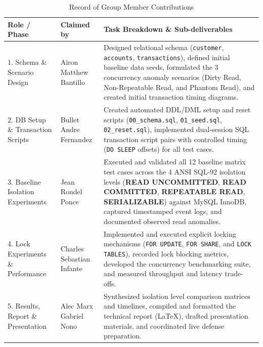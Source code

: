 \documentclass[sigconf, pbalance, nonacm]{acmart}
\begin{document}
\begin{table}[t]
\centering
\small
\caption{Record of Group Member Contributions}
\label{tab:contribution}
\begin{tabularx}{\textwidth}{p{3.8cm} p{3.8cm} X}
\toprule
\textbf{Role / Phase} & \textbf{Claimed by} & \textbf{Task Breakdown \& Sub-deliverables} \\
\midrule
1. Schema \& Scenario Design & Airon Matthew Bantillo & Designed relational schema (\texttt{customer}, \texttt{accounts}, \texttt{transactions}), defined initial baseline data seeds, formulated the 3 concurrency anomaly scenarios (Dirty Read, Non-Repeatable Read, and Phantom Read), and created initial transaction timing diagrams. \\
\midrule
2. DB Setup \& Transaction Scripts & Bullet Andre Fernandez & Created automated DDL/DML setup and reset scripts (\texttt{00\_schema.sql}, \texttt{01\_seed.sql}, \texttt{02\_reset.sql}), implemented dual-session SQL transaction script pairs with controlled timing (\texttt{DO SLEEP} offsets) for all test cases. \\
\midrule
3. Baseline Isolation Experiments & Jean Rondel Ponce & Executed and validated all 12 baseline matrix test cases across the 4 ANSI SQL-92 isolation levels (\textbf{READ UNCOMMITTED}, \textbf{READ COMMITTED}, \textbf{REPEATABLE READ}, \textbf{SERIALIZABLE}) against MySQL InnoDB, captured timestamped event logs, and documented observed read anomalies. \\
\midrule
4. Lock Experiments \& Performance & Charles Sebastian Infante & Implemented and executed explicit locking mechanisms (\texttt{FOR UPDATE}, \texttt{FOR SHARE}, and \texttt{LOCK TABLES}), recorded lock blocking metrics, developed the concurrency benchmarking suite, and measured throughput and latency trade-offs. \\
\midrule
5. Results, Report \& Presentation & Alec Marx Gabriel Nono & Synthesized isolation level comparison matrices and timelines, compiled and formatted the technical report (\LaTeX), drafted presentation materials, and coordinated live defense preparation. \\
\bottomrule
\end{tabularx}
\end{table}
\end{document}
